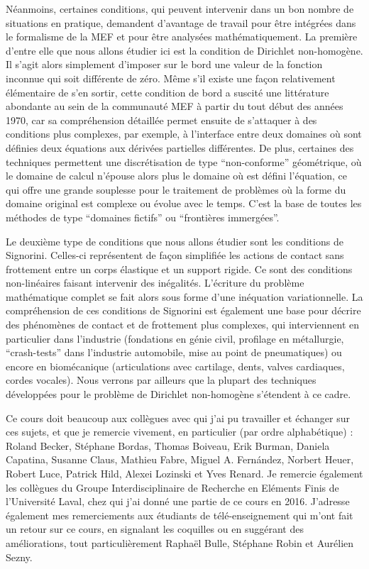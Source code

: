 \documentclass[11pt]{book}
\begin{document}
Néanmoins, certaines conditions, qui peuvent intervenir dans un bon nombre de situations en pratique, demandent d'avantage de travail pour être intégrées dans le formalisme de la MEF et pour être analysées mathématiquement. La première d'entre elle que nous allons étudier ici est la condition de Dirichlet non-homogène. Il s'agit alors simplement d'imposer sur le bord une valeur de la fonction inconnue qui soit différente de zéro. Même s'il existe une façon relativement élémentaire de s'en sortir, cette condition de bord a suscité une littérature abondante au sein de la communauté MEF à partir du tout début des années 1970, car sa compréhension détaillée permet ensuite de s'attaquer à des conditions plus complexes, par exemple, à l'interface entre deux domaines où sont définies deux équations aux dérivées partielles différentes. De plus, certaines des techniques permettent une discrétisation de type ``non-conforme'' géométrique, où le domaine de calcul n'épouse alors plus le domaine où est défini l'équation, ce qui offre une grande souplesse pour le traitement de problèmes où la forme du domaine original est complexe ou évolue avec le temps. C'est la base de toutes les méthodes de type ``domaines fictifs'' ou ``frontières immergées''.

Le deuxième type de conditions que nous allons étudier sont les conditions de Signorini. Celles-ci représentent de façon simplifiée les actions de contact sans frottement entre un corps élastique et un support rigide. Ce sont des conditions non-linéaires faisant intervenir des inégalités. L'écriture du problème mathématique complet se fait alors sous forme d'une inéquation variationnelle. La compréhension de ces conditions de Signorini est également une base pour décrire des phénomènes de contact et de frottement plus complexes, qui interviennent en particulier dans l'industrie (fondations en génie civil, profilage en métallurgie, ``crash-tests'' dans l'industrie automobile, mise au point de pneumatiques) ou encore en biomécanique (articulations avec cartilage, dents, valves cardiaques, cordes vocales). Nous verrons par ailleurs que la plupart des techniques développées pour le problème de Dirichlet non-homogène s'étendent à ce cadre.

Ce cours doit beaucoup aux collègues avec qui j'ai pu travailler et échanger sur ces sujets, et que je remercie vivement, en particulier (par ordre alphabétique) : Roland Becker, Stéphane Bordas, Thomas Boiveau, Erik Burman, Daniela Capatina, Susanne Claus, Mathieu Fabre, Miguel A. Fern\'andez, Norbert Heuer, Robert Luce, Patrick Hild, Alexei Lozinski et Yves Renard. Je remercie également les collègues du Groupe Interdisciplinaire de Recherche en Eléments Finis de l'Université Laval, chez qui j'ai donné une partie de ce cours en 2016. %
J'adresse également mes remerciements aux étudiants de télé-enseignement qui m'ont fait un retour sur ce cours, en signalant les coquilles ou en suggérant des améliorations, tout particulièrement Raphaël Bulle, Stéphane Robin et Aurélien Sezny.
\end{document}
